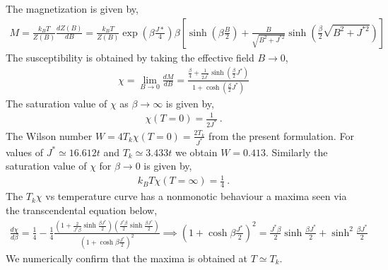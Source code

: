 \documentclass[aps,prl,preprint,groupedaddress]{revtex4-2}
\begin{document}
The magnetization is given by,
\begin{eqnarray}
M=\frac{k_{B}T}{Z(B)}\frac{dZ(B)}{dB}=\frac{k_{B}T}{Z(B)}\exp(\beta\frac{J*}{4})\beta\left[\sinh(\beta\frac{B}{2})
+\frac{B}{\sqrt{B^{2}+J^{*2}}}\sinh(\frac{\beta}{2}\sqrt{B^{2}+J^{*2}})\right]
\end{eqnarray}
The susceptibility is obtained by taking the effective field $B\to 0$,
\begin{eqnarray}
\chi=\lim_{B\to 0}\frac{dM}{dB}=\frac{\frac{\beta}{4}+\frac{1}{2J^{*}}\sinh(\frac{\beta}{2}J^{*})}{1+\cosh(\frac{\beta}{2}J^{*})}
\end{eqnarray}
The saturation value of $\chi$ as $\beta\to \infty$ is given by,
\begin{eqnarray}
\chi(T=0)=\frac{1}{2J^{*}}~.
\end{eqnarray}
The Wilson number $W=4T_{k}\chi(T=0)=\frac{2T_{k}}{J^{*}}$ from the present formulation. For values of $J^{*}\simeq 16.612t$ and $T_{k}\simeq 3.433t$ we obtain $W=0.413$. Similarly the saturation value of $\chi$ for $\beta\to 0$ is given by,
\begin{eqnarray}
k_{B}T\chi(T=\infty)=\frac{1}{4}~.
\end{eqnarray}
The $T_{k}\chi$ vs temperature curve has a nonmonotic behaviour a maxima seen via the transcendental equation below,
\begin{eqnarray}
\frac{d\chi}{d\beta}=\frac{1}{4}-\frac{1}{4}\frac{(1+\frac{2}{J^{*}\beta}\sinh\frac{\beta J^{*}}{2})(\frac{J^{*}\beta}{2}\sinh\frac{\beta J^{*}}{2})}{(1+\cosh\beta\frac{J^{*}}{2})^{2}} \implies (1+\cosh\beta\frac{J^{*}}{2})^{2}=\frac{J^{*}\beta}{2}\sinh\frac{\beta J^{*}}{2}+\sinh^{2}\frac{\beta J^{*}}{2}~~~~~~
\end{eqnarray} 
We numerically confirm that the maxima is obtained at $T\simeq T_{k}$.


\end{document}
